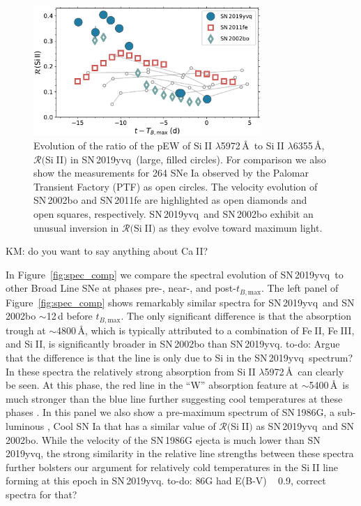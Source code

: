 \documentclass[twocolumn]{aastex63}
\def\ion#1#2{#1$\;${\footnotesize\rm{#2}}\relax}
\newcommand{\kate}[1]{{\color{red} KM: {#1}}}
\newcommand{\todo}[1]{{\color{magenta} to-do: {#1}}}
\newcommand{\tbmax}{$t_{B,\mathrm{max}}$}
\newcommand{\sn}{SN\,2019yvq}
\begin{document}
\begin{figure}
    \centering
    \includegraphics[width=3.4in]{./figures/R_evolution.pdf}
    \caption{Evolution of the ratio of the pEW of \ion{Si}{II}
    $\lambda$5972\,\AA\ to \ion{Si}{II} $\lambda$6355\,\AA,
    $\mathcal{R}($\ion{Si}{II}$)$ in \sn\ (large, filled circles). For
    comparison we also show the measurements for 264 SNe Ia observed by the
    Palomar Transient Factory (PTF) as open circles. The velocity evolution
    of SN\,2002bo and SN\,2011fe are highlighted as open diamonds and open
    squares, respectively. \sn\ and SN\,2002bo exhibit an unusual inversion
    in $\mathcal{R}($\ion{Si}{II}$)$ as they evolve toward maximum light.}
    \label{fig:r_evo}
\end{figure}


\kate{do you want to say anything about \ion{Ca}{II}?}


In Figure~\ref{fig:spec_comp} we compare the spectral evolution of \sn\ to
other \citet{Branch06} Broad Line SNe at phases pre-, near-, and post-\tbmax.
The left panel of Figure~\ref{fig:spec_comp} shows remarkably similar spectra
for \sn\ and SN\,2002bo $\sim$12\,d before \tbmax. The only significant
difference is that the absorption trough at $\sim$4800\,\AA, which is
typically attributed to a combination of \ion{Fe}{II}, \ion{Fe}{III}, and
\ion{Si}{II}, is significantly broader in SN\,2002bo than \sn. \todo{Argue
that the difference is that the line is only due to Si in the \sn\ spectrum?}
In these spectra the relatively strong absorption from \ion{Si}{II}
$\lambda$5972\,\AA\ can clearly be seen. At this phase, the red line in the
``W'' absorption feature at $\sim$5400\,\AA\ is much stronger than the blue
line further suggesting cool temperatures at these phases \citep{Nugent95}.
In this panel we also show a pre-maximum spectrum of SN\,1986G, a
sub-luminous \citep{Phillips87}, \citet{Branch06} Cool SN Ia that has a
similar value of $\mathcal{R}($\ion{Si}{II}$)$ as \sn\ and SN\,2002bo. While
the velocity of the SN\,1986G ejecta is much lower than \sn, the strong
similarity in the relative line strengths between these spectra further
bolsters our argument for relatively cold temperatures in the \ion{Si}{II}
line forming at this epoch in \sn. \todo{86G had E(B-V) ~ 0.9, correct spectra for that?}
\end{document}
